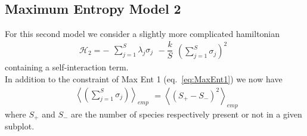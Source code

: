\documentclass[a4paper,11pt]{article}
\begin{document}
\subsection{Maximum Entropy Model 2}
For this second model we consider a slightly more complicated hamiltonian
\begin{equation}
    \mathcal{H}_2 = - \begin{matrix} \sum_{j=1}^S \lambda_j \sigma_j \end{matrix} - \frac{k}{S} \begin{matrix}  \left ( \sum_{j=1}^S \sigma_j \right )^2 \end{matrix}
    \label{maxent2}
\end{equation}
containing a self-interaction term.
\\
In addition to the constraint of Max Ent 1 (eq.~\ref{eq:MaxEnt1}) we now have
\begin{equation}
    \begin{matrix}\left \langle \left ( \sum_{j=1}^S 
    \sigma_j \right ) \right \rangle_{emp} \end{matrix} = \left \langle (S_+ - S_-)^2 \right \rangle_{emp}
\end{equation}
where $S_+$ and $S_-$ are the number of species respectively present or not in a given subplot.
\end{document}
